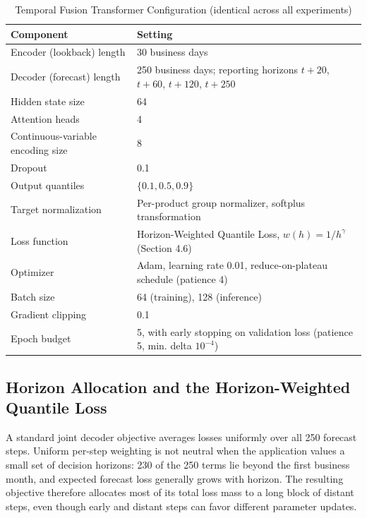 \documentclass[review,3p,times]{elsarticle}
\begin{document}
\begin{table}[htbp]\centering
\caption{Temporal Fusion Transformer Configuration (identical across all experiments)}
\small
\begin{tabular}{ll}
\toprule
Component & Setting \\
\midrule
Encoder (lookback) length & 30 business days \\
Decoder (forecast) length & 250 business days; reporting horizons $t+20$, $t+60$, $t+120$, $t+250$ \\
Hidden state size & 64 \\
Attention heads & 4 \\
Continuous-variable encoding size & 8 \\
Dropout & 0.1 \\
Output quantiles & $\{0.1, 0.5, 0.9\}$ \\
Target normalization & Per-product group normalizer, softplus transformation \\
Loss function & Horizon-Weighted Quantile Loss, $w(h) = 1/h^\gamma$ (Section 4.6) \\
Optimizer & Adam, learning rate 0.01, reduce-on-plateau schedule (patience 4) \\
Batch size & 64 (training), 128 (inference) \\
Gradient clipping & 0.1 \\
Epoch budget & 5, with early stopping on validation loss (patience 5, min. delta $10^{-4}$) \\
\bottomrule
\end{tabular}
\end{table}

\setcounter{subsection}{5}

\subsection{Horizon Allocation and the Horizon-Weighted Quantile Loss}

A standard joint decoder objective averages losses uniformly over all 250 forecast steps. Uniform per-step weighting is not neutral when the application values a small set of decision horizons: 230 of the 250 terms lie beyond the first business month, and expected forecast loss generally grows with horizon. The resulting objective therefore allocates most of its total loss mass to a long block of distant steps, even though early and distant steps can favor different parameter updates.
\end{document}
